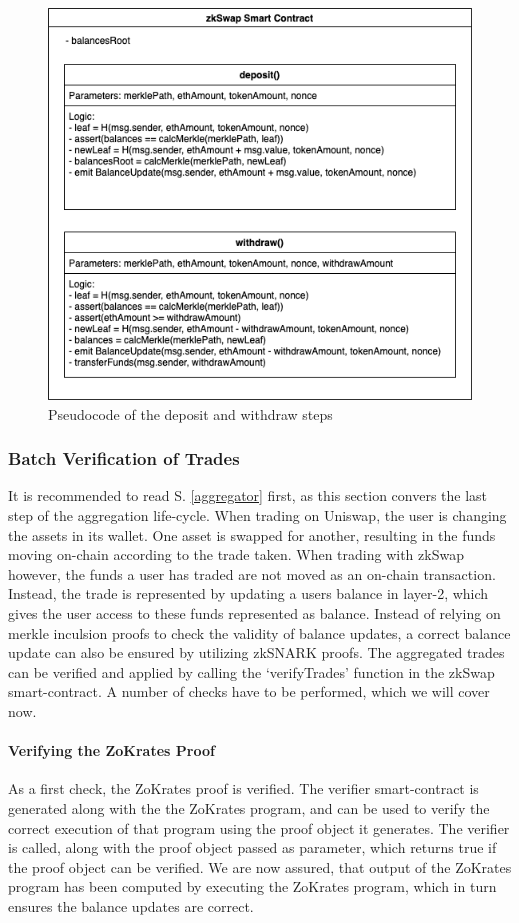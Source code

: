 \documentclass[../../thesis.tex]{subfiles}
\begin{document}
\begin{figure}[h]
    \centerline{\includegraphics[totalheight=8cm]{diagrams/deposit.png}}
    \caption{Pseudocode of the deposit and withdraw steps}
    \label{fig:dep_with}
\end{figure}


\subsubsection{Batch Verification of Trades}
It is recommended to read S. \ref{aggregator} first, as this section convers the last step of the aggregation life-cycle. When trading on Uniswap, the user is changing the assets in its wallet. One asset is swapped for another, resulting in the funds moving on-chain according to the trade taken. When trading with zkSwap however, the funds a user has traded are not moved as an on-chain transaction. Instead, the trade is represented by updating a users balance in layer-2, which gives the user access to these funds represented as balance. Instead of relying on merkle inculsion proofs to check the validity of balance updates, a correct balance update can also be ensured by utilizing zkSNARK proofs. The aggregated trades can be verified and applied by calling the `verifyTrades' function in the zkSwap smart-contract. A number of checks have to be performed, which we will cover now.

\paragraph{Verifying the ZoKrates Proof}
As a first check, the ZoKrates proof is verified. The verifier smart-contract is generated along with the the ZoKrates program, and can be used to verify the correct execution of that program using the proof object it generates. The verifier is called, along with the proof object passed as parameter, which returns true if the proof object can be verified. We are now assured, that output of the ZoKrates program has been computed by executing the ZoKrates program, which in turn ensures the balance updates are correct. 
\end{document}
